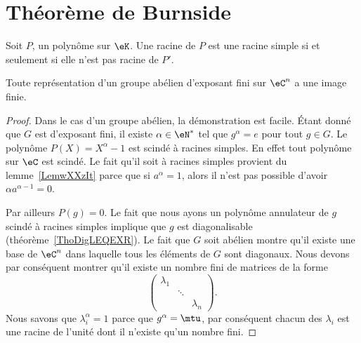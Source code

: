 

\section{Théorème de Burnside}

\begin{lemma}       \label{LemwXXzIt}
    Soit \( P\), un polynôme sur \( \eK\). Une racine de \( P\) est une racine simple si et seulement si elle n'est pas racine de \( P'\).
\end{lemma}

\begin{theorem}     \label{ThoBurnsideoPuCtS}
    Toute représentation d'un groupe abélien d'exposant fini sur \( \eC^n\) a une image finie.
\end{theorem}

\begin{proof}
    Dans le cas d'un groupe abélien, la démonstration est facile. Étant donné que \( G\) est d'exposant fini, il existe \( \alpha\in \eN^*\) tel que \( g^{\alpha}=e\) pour tout \( g\in G\). Le polynôme \( P(X)=X^{\alpha}-1\) est scindé à racines simples. En effet tout polynôme sur \( \eC\) est scindé. Le fait qu'il soit à racines simples provient du lemme~\ref{LemwXXzIt} parce que si \( a^{\alpha}=1\), alors il n'est pas possible d'avoir \( \alpha a^{\alpha-1}=0\).

    Par ailleurs \( P(g)=0\). Le fait que nous ayons un polynôme annulateur de \( g\) scindé à racines simples implique que \( g\) est diagonalisable (théorème~\ref{ThoDigLEQEXR}). Le fait que \( G\) soit abélien montre qu'il existe une base de \( \eC^n\) dans laquelle tous les éléments de \( G\) sont diagonaux. Nous devons par conséquent montrer qu'il existe un nombre fini de matrices de la forme
    \begin{equation}
        \begin{pmatrix}
            \lambda_1    &       &       \\
                &   \ddots    &       \\
                &       &   \lambda_n
        \end{pmatrix}.
    \end{equation}
    Nous savons que \( \lambda_i^{\alpha}=1\) parce que \( g^{\alpha}=\mtu\), par conséquent chacun des \( \lambda_i\) est une racine de l'unité dont il n'existe qu'un nombre fini.
\end{proof}

